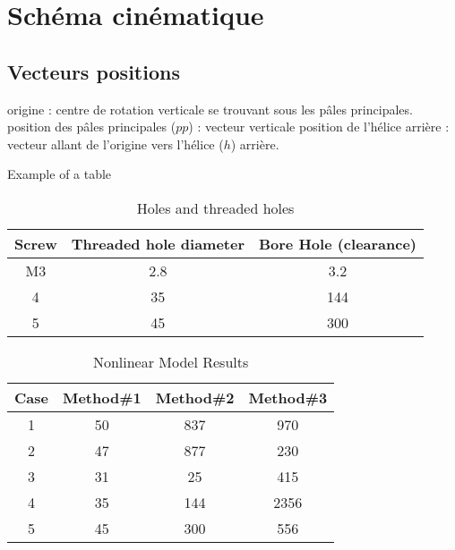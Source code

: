\documentclass[12pt,a4paper]{article}
\begin{document}
\newpage
\section{Schéma cinématique}


\subsection{Vecteurs positions}
origine : centre de rotation verticale se trouvant sous les pâles principales.
\medbreak
position  des pâles principales ($pp$) : vecteur verticale
\medbreak
position de l'hélice arrière : 
vecteur allant de l'origine vers l'hélice ($h$) arrière. 


\newpage


Example of a table
\begin{table}[ht]
	\caption{Holes and threaded holes} %
	\centering %
	\begin{tabular}{c c c} %
		\hline\hline %
		Screw & Threaded hole diameter & Bore Hole (clearance) \\ [0.5ex] %
		\hline %
		M3 & 2.8 & 3.2 \\ %
		4 & 35 & 144 \\
		5 & 45 & 300 \\ [1ex] %
		\hline %
	\end{tabular}\label{table:nonlin} %
\end{table}

\begin{table}[ht]
	\caption{Nonlinear Model Results} %
	\centering %
	\begin{tabular}{c c c c} %
		\hline\hline %
		Case & Method\#1 & Method\#2 & Method\#3 \\ [0.5ex] %
		\hline %
		1 & 50 & 837 & 970 \\ %
		2 & 47 & 877 & 230 \\
		3 & 31 & 25 & 415 \\
		4 & 35 & 144 & 2356 \\
		5 & 45 & 300 & 556 \\ [1ex] %
		\hline %
	\end{tabular}\label{table:nonlin} %
\end{table}
\end{document}
